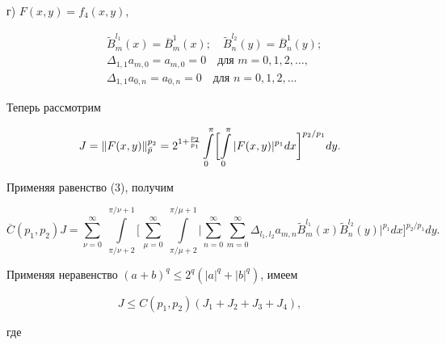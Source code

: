г) $F(x,y)=f_4(x,y)$,


\begin{align*} 


&\widetilde B_m^{l_1}(x)=\overline B_m^1(x);\quad 


\widetilde B_n^{l_2}(y)=\overline B_n^1(y);\\ 


&\Delta_{1,1}a_{m,0}=a_{m,0}=0\quad\text{для }m=0,1,2,\dotsc,\\ 


&\Delta_{1,1}a_{0,n}=a_{0,n}=0\quad\text{для }n=0,1,2,\dotsc 


\end{align*} 


% 


Теперь рассмотрим 


$$ 


J=\|F(x,y)\|^{p_2}_{\Bar p}=2^{1+\frac{p_2}{p_1}}\int\limits^\pi_0 


\biggl[\int\limits^\pi_0|F(x,y)|^{p_1}dx


\biggr]^{p_2/p_1}dy. 


$$ 


Применяя равенство (3), получим 


$$ 


\overline C(p_1,p_2)J=\sum^\infty_{\nu=0} \;


\int\limits^{\pi/\nu+1}_{\pi/\nu+2}\biggl[\, 


\sum^\infty_{\mu=0}\;\int\limits^{\pi/\mu+1}_{\pi/\mu+2}\biggl| 


\sum^\infty_{n=0}\sum^\infty_{m=0}\Delta_{l_1,l_2}a_{m,n} 


\widetilde B_m^{l_1}(x)\widetilde B_n^{l_2}(y)\biggr|^{p_1}dx 


\biggr]^{p_2/p_1}dy. 


$$ 


Применяя неравенство $(a+b)^q\le 2^q(|a|^q+|b|^q)$, имеем 


$$ 


J\le C(p_1,p_2)(J_1+J_2+J_3+J_4), 


$$ 


где 



